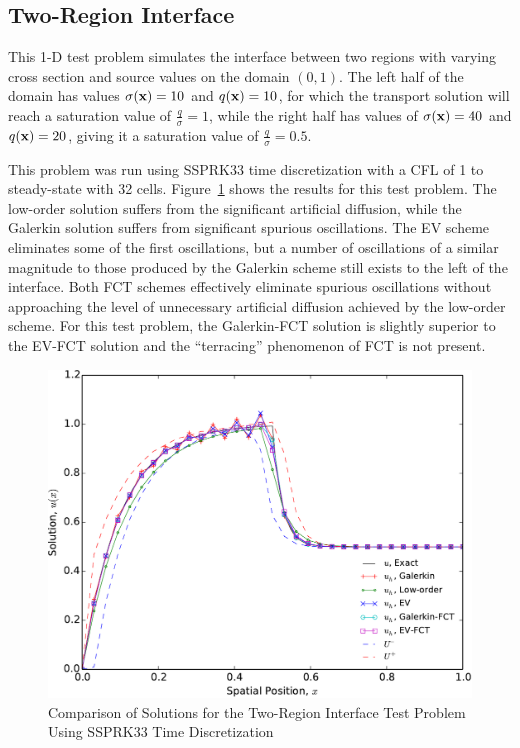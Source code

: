 \subsection{Two-Region Interface}
This 1-D test problem simulates the interface between two regions with
varying cross section and source values on the domain $(0,1)$.
The left half of the domain has values $\sigma(\mathbf{x})=10$ and $q(\mathbf{x})=10$, for which the transport
solution will reach a
saturation value of $\frac{q}{\sigma}=1$, while the right half has values
of $\sigma(\mathbf{x})=40$ and $q(\mathbf{x})=20$, giving it a saturation value of
$\frac{q}{\sigma}=0.5$.

This problem was run using SSPRK33 time discretization with a CFL of 1 to
steady-state with 32 cells. Figure~\ref{fig:interface} shows the results
for this test problem. The low-order solution suffers from the significant
artificial diffusion, while the Galerkin solution suffers from significant
spurious oscillations. The EV scheme eliminates some of the first oscillations,
but a number of oscillations of a similar magnitude to those produced by
the Galerkin scheme still exists to the left of the interface. Both FCT
schemes effectively eliminate spurious oscillations without approaching
the level of unnecessary artificial diffusion achieved by the low-order
scheme. For this test problem, the Galerkin-FCT solution is slightly
superior to the EV-FCT solution and the ``terracing'' phenomenon
of FCT is not present.

\begin{figure}[htb]
   \centering
      \includegraphics[width=\textwidth]
        {images/solution_interface.pdf}
      \caption{Comparison of Solutions for the Two-Region Interface Test
       Problem Using SSPRK33 Time Discretization}
   \label{fig:interface}
\end{figure}
\clearpage
